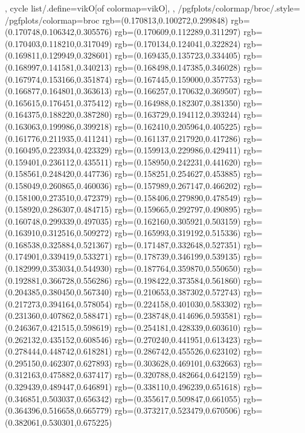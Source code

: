 {{{		},
	cycle list/.define={vikO}{[of colormap=vikO]},
	},
	/pgfplots/colormap/broc/.style={
		/pgfplots/colormap={broc}{%
			rgb=(0.170813,0.100272,0.299848)
			rgb=(0.170748,0.106342,0.305576)
			rgb=(0.170609,0.112289,0.311297)
			rgb=(0.170403,0.118210,0.317049)
			rgb=(0.170134,0.124041,0.322824)
			rgb=(0.169811,0.129949,0.328601)
			rgb=(0.169435,0.135723,0.334405)
			rgb=(0.168997,0.141581,0.340213)
			rgb=(0.168498,0.147385,0.346028)
			rgb=(0.167974,0.153166,0.351874)
			rgb=(0.167445,0.159000,0.357753)
			rgb=(0.166877,0.164801,0.363613)
			rgb=(0.166257,0.170632,0.369507)
			rgb=(0.165615,0.176451,0.375412)
			rgb=(0.164988,0.182307,0.381350)
			rgb=(0.164375,0.188220,0.387280)
			rgb=(0.163729,0.194112,0.393244)
			rgb=(0.163063,0.199986,0.399218)
			rgb=(0.162410,0.205964,0.405225)
			rgb=(0.161776,0.211935,0.411241)
			rgb=(0.161137,0.217920,0.417286)
			rgb=(0.160495,0.223934,0.423329)
			rgb=(0.159913,0.229986,0.429411)
			rgb=(0.159401,0.236112,0.435511)
			rgb=(0.158950,0.242231,0.441620)
			rgb=(0.158561,0.248420,0.447736)
			rgb=(0.158251,0.254627,0.453885)
			rgb=(0.158049,0.260865,0.460036)
			rgb=(0.157989,0.267147,0.466202)
			rgb=(0.158100,0.273510,0.472379)
			rgb=(0.158406,0.279890,0.478549)
			rgb=(0.158920,0.286307,0.484715)
			rgb=(0.159665,0.292797,0.490895)
			rgb=(0.160748,0.299339,0.497035)
			rgb=(0.162160,0.305921,0.503159)
			rgb=(0.163910,0.312516,0.509272)
			rgb=(0.165993,0.319192,0.515336)
			rgb=(0.168538,0.325884,0.521367)
			rgb=(0.171487,0.332648,0.527351)
			rgb=(0.174901,0.339419,0.533271)
			rgb=(0.178739,0.346199,0.539135)
			rgb=(0.182999,0.353034,0.544930)
			rgb=(0.187764,0.359870,0.550650)
			rgb=(0.192881,0.366728,0.556286)
			rgb=(0.198422,0.373584,0.561860)
			rgb=(0.204385,0.380450,0.567340)
			rgb=(0.210653,0.387302,0.572743)
			rgb=(0.217273,0.394164,0.578054)
			rgb=(0.224158,0.401030,0.583302)
			rgb=(0.231360,0.407862,0.588471)
			rgb=(0.238748,0.414696,0.593581)
			rgb=(0.246367,0.421515,0.598619)
			rgb=(0.254181,0.428339,0.603610)
			rgb=(0.262132,0.435152,0.608546)
			rgb=(0.270240,0.441951,0.613423)
			rgb=(0.278444,0.448742,0.618281)
			rgb=(0.286742,0.455526,0.623102)
			rgb=(0.295150,0.462307,0.627893)
			rgb=(0.303628,0.469101,0.632663)
			rgb=(0.312163,0.475882,0.637417)
			rgb=(0.320788,0.482664,0.642159)
			rgb=(0.329439,0.489447,0.646891)
			rgb=(0.338110,0.496239,0.651618)
			rgb=(0.346851,0.503037,0.656342)
			rgb=(0.355617,0.509847,0.661055)
			rgb=(0.364396,0.516658,0.665779)
			rgb=(0.373217,0.523479,0.670506)
			rgb=(0.382061,0.530301,0.675225)
}}}
